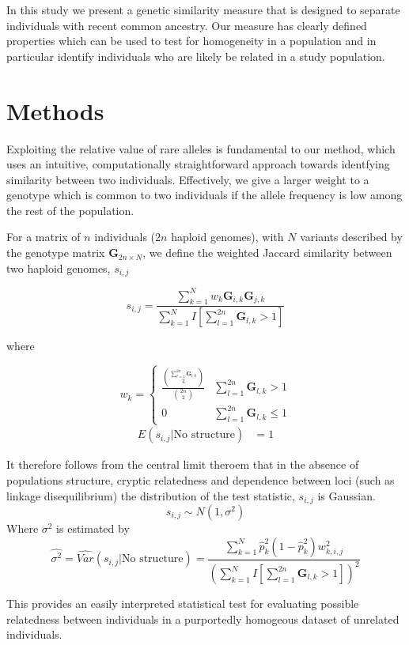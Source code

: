 \documentclass[english]{article}
\begin{document}
In this study we present a genetic similarity measure that is designed
to separate individuals with recent common ancestry. Our measure has
clearly defined properties which can be used to test for homogeneity
in a population and in particular identify individuals who are likely
be related in a study population.


\section*{Methods}

Exploiting the relative value of rare alleles is fundamental to our
method, which uses an intuitive, computationally straightforward approach
towards identfying similarity between two individuals. Effectively,
we give a larger weight to a genotype which is common to two individuals
if the allele frequency is low among the rest of the population.

For a matrix of $n$ individuals ($2n$ haploid genomes), with $N$
variants described by the genotype matrix $\mathbf{G}_{2n\times N}$,
we define the weighted Jaccard similarity between two haploid genomes,
$s_{i,j}$

\[
s_{i,j}=\frac{\sum_{k=1}^{N}w_{k}\mathbf{G}_{i,k}\mathbf{G}_{j,k}}{\sum_{k=1}^{N}I\left[\sum_{l=1}^{2n}\mathbf{G}_{l,k}>1\right]}
\]


where 

\[
w_{k}=\begin{cases}
\frac{{\sum_{l=1}^{2n}\mathbf{G}_{l,k} \choose 2}}{{2n \choose 2}} & \sum_{l=1}^{2n}\mathbf{G}_{l,k}>1\\
0 & \sum_{l=1}^{2n}\mathbf{G}_{l,k}\le1
\end{cases}
\]
\begin{align*}
E\left(s_{i,j}|\mbox{No structure}\right) & =1
\end{align*}


It therefore follows from the central limit theroem that in the absence
of populations structure, cryptic relatedness and dependence between
loci (such as linkage disequilibrium) the distribution of the test
statistic, $s_{i,j}$ is Gaussian.
\[
s_{i,j}\sim N\left(1,\sigma^{2}\right)
\]
Where $\sigma^{2}$ is estimated by 
\[
\hat{\sigma^{2}}=\hat{Var}\left(s_{i,j}|\mbox{No structure}\right)=\frac{\sum_{k=1}^{N}\hat{p}_{k}^{2}\left(1-\hat{p}_{k}^{2}\right)w_{k,i,j}^{2}}{\left(\sum_{k=1}^{N}I\left[\sum_{l=1}^{2n}\mathbf{G}_{l,k}>1\right]\right)^{2}}
\]


This provides an easily interpreted statistical test for evaluating
possible relatedness between individuals in a purportedly homogeous
dataset of unrelated individuals.
\end{document}
